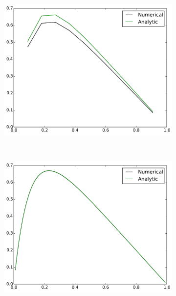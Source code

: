 \documentclass[12pt,norsk,a4paper]{article}
\begin{document}
\begin{figure}[t!]
    \centering
    \begin{subfigure}[t]{0.3\textwidth}
        \centering
		\includegraphics[width=\linewidth]{bilder/n10}
		\label{fig:n1000}
    \end{subfigure}%
    ~ 
    \begin{subfigure}[t]{0.3\textwidth}
        \centering
		\includegraphics[width=\linewidth]{bilder/n100}
		\label{fig:n1000}
    \end{subfigure}
     ~ 
    \begin{subfigure}[t]{0.3\textwidth}
        \centering

\end{subfigure}
\end{figure}
\end{document}

